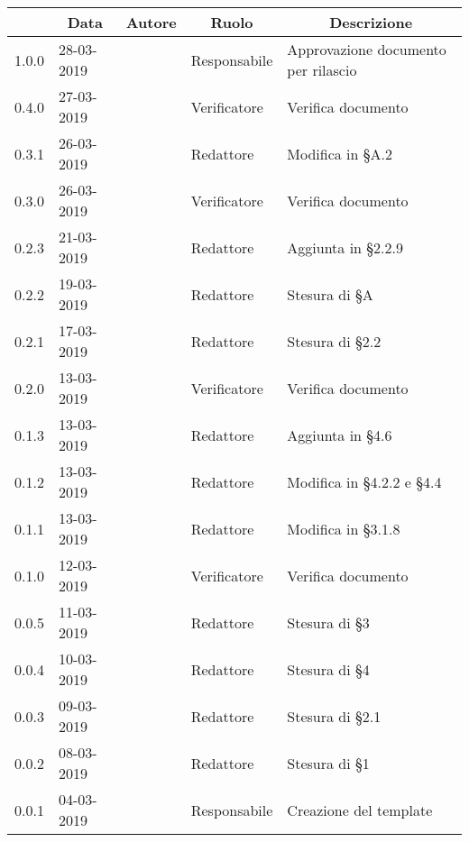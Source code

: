 \pagestyle{styleDocPages}

\begin{center} \sloppy
	\renewcommand{\arraystretch}{2.5}
	
	\begin{longtable}[H]{p{1.7cm} p{2cm} p{1.8cm} p{2.5cm} p{4cm}}
\rowcolor[HTML]{232f3e}
\multicolumn{1}{c}{\color[HTML]{FFFFFF} \textbf{Versione}} & 
\multicolumn{1}{c}{\color[HTML]{FFFFFF} \textbf{Data}} & 
\multicolumn{1}{c}{\color[HTML]{FFFFFF} \textbf{Autore}} & 
\multicolumn{1}{c}{\color[HTML]{FFFFFF} \textbf{Ruolo}} & 
\multicolumn{1}{c}{\color[HTML]{FFFFFF} \textbf{Descrizione}} \\
\endhead

1.0.0 & 28-03-2019 & \francesco{} & Responsabile & Approvazione documento per rilascio\\
0.4.0 & 27-03-2019 & \daniele{} & Verificatore & Verifica documento\\
0.3.1 & 26-03-2019 & \giacomo{} & Redattore & Modifica in §A.2\\
0.3.0 & 26-03-2019 & \valentin{} & Verificatore & Verifica documento\\
0.2.3 & 21-03-2019 & \andrea{} & Redattore & Aggiunta in §2.2.9\\
0.2.2 & 19-03-2019 & \singh{} & Redattore & Stesura di §A\\
0.2.1 & 17-03-2019 & \singh{} & Redattore & Stesura di §2.2\\
0.2.0 & 13-03-2019 & \davide{} & Verificatore & Verifica documento\\
0.1.3 & 13-03-2019 & \giacomo{} & Redattore & Aggiunta in §4.6\\
0.1.2 & 13-03-2019 & \giacomo{} & Redattore & Modifica in §4.2.2 e §4.4\\
0.1.1 & 13-03-2019 & \andrea{} & Redattore & Modifica in §3.1.8\\
0.1.0 & 12-03-2019 & \davide{} & Verificatore & Verifica documento\\
0.0.5 & 11-03-2019 & \andrea{} & Redattore & Stesura di §3\\
0.0.4 & 10-03-2019 & \giacomo{} & Redattore & Stesura di §4\\
0.0.3 & 09-03-2019 & \andrea{} & Redattore & Stesura di §2.1\\
0.0.2 & 08-03-2019 & \andrea{} & Redattore & Stesura di §1\\
0.0.1 & 04-03-2019 & \francesco{} & Responsabile & Creazione del template\\

\end{longtable}
\end{center}
